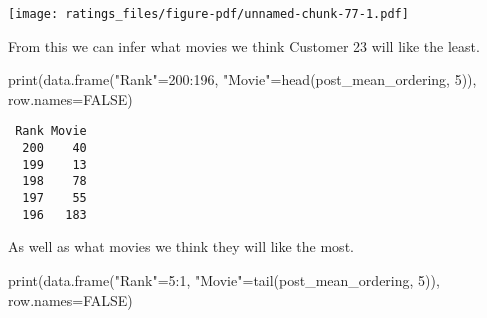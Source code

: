 \documentclass[
  letterpaper,
  DIV=11,
  numbers=noendperiod]{scrartcl}
\newenvironment{Shaded}{\begin{snugshade}}{\end{snugshade}}
\newcommand{\AttributeTok}[1]{\textcolor[rgb]{0.40,0.45,0.13}{#1}}
\newcommand{\ConstantTok}[1]{\textcolor[rgb]{0.56,0.35,0.01}{#1}}
\newcommand{\ControlFlowTok}[1]{\textcolor[rgb]{0.00,0.23,0.31}{#1}}
\newcommand{\DecValTok}[1]{\textcolor[rgb]{0.68,0.00,0.00}{#1}}
\newcommand{\FunctionTok}[1]{\textcolor[rgb]{0.28,0.35,0.67}{#1}}
\newcommand{\NormalTok}[1]{\textcolor[rgb]{0.00,0.23,0.31}{#1}}
\newcommand{\OtherTok}[1]{\textcolor[rgb]{0.00,0.23,0.31}{#1}}
\newcommand{\SpecialCharTok}[1]{\textcolor[rgb]{0.37,0.37,0.37}{#1}}
\newcommand{\StringTok}[1]{\textcolor[rgb]{0.13,0.47,0.30}{#1}}
\begin{document}
\begin{Shaded}
\end{Shaded}

\texttt{[image: ratings\_files/figure-pdf/unnamed-chunk-77-1.pdf]}

From this we can infer what movies we think Customer 23 will like the
least.

\begin{Shaded}
\begin{Highlighting}[]
\FunctionTok{print}\NormalTok{(}\FunctionTok{data.frame}\NormalTok{(}\StringTok{"Rank"}\OtherTok{=}\DecValTok{200}\SpecialCharTok{:}\DecValTok{196}\NormalTok{,}
                 \StringTok{"Movie"}\OtherTok{=}\FunctionTok{head}\NormalTok{(post\_mean\_ordering, }\DecValTok{5}\NormalTok{)),}
      \AttributeTok{row.names=}\ConstantTok{FALSE}\NormalTok{)}
\end{Highlighting}
\end{Shaded}

\begin{verbatim}
 Rank Movie
  200    40
  199    13
  198    78
  197    55
  196   183
\end{verbatim}

As well as what movies we think they will like the most.

\begin{Shaded}
\begin{Highlighting}[]
\FunctionTok{print}\NormalTok{(}\FunctionTok{data.frame}\NormalTok{(}\StringTok{"Rank"}\OtherTok{=}\DecValTok{5}\SpecialCharTok{:}\DecValTok{1}\NormalTok{,}
                 \StringTok{"Movie"}\OtherTok{=}\FunctionTok{tail}\NormalTok{(post\_mean\_ordering, }\DecValTok{5}\NormalTok{)),}
      \AttributeTok{row.names=}\ConstantTok{FALSE}\NormalTok{)}
\end{Highlighting}
\end{Shaded}
\end{document}
